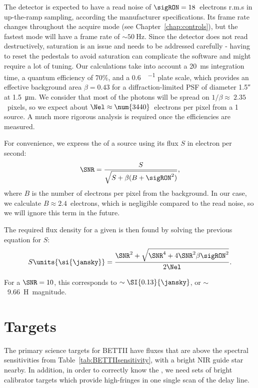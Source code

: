The detector is expected to have a read noise of $\sigRON = 18$~electrons r.m.s in up-the-ramp sampling, according the manufacturer specifications. Its frame rate changes throughout the acquire mode (see Chapter~\ref{chap:controls}), but the fastest mode will have a frame rate of $\sim\SI{50}{\hertz}$. Since the detector does not read destructively, saturation is an issue and needs to be addressed carefully - having to reset the pedestals to avoid saturation can complicate the software and might require a lot of tuning. Our calculations take into account a \SI{20}{\milli\second} integration time, a quantum efficiency of 70\%, and a \SI{0.6}{\arcsec\per\pixel} plate scale, which provides an effective background area $\beta = 0.43$ for a diffraction-limited PSF of diameter \ang{;;1.5} at \SI{1.5}{\micro\meter}. We consider that most of the photons will be spread on $1/\beta\approx~2.35$~pixels, so we expect about $\Nel\approx\num{3440}$~electrons per pixel from a \SI{1}{\jansky} source. A much more rigorous analysis is required once the efficiencies are measured.

For convenience, we express the \SNR of a source using its flux $S$ in electron per second:
\begin{align}
\SNR = \frac{S}{\sqrt{S + \beta(B + \sigRON^2)}},
\end{align}
where $B$ is the number of electrons per pixel from the background. In our case, we calculate $B\approx 2.4$~electrons, which is negligible compared to the read noise, so we will ignore this term in the future.

The required flux density for a given \SNR is then found by solving the previous equation for $S$:
\begin{align}
S\units{\si{\jansky}} = \frac{\SNR^2 + \sqrt{\SNR^4 + 4\SNR^2\beta\sigRON^2}}{2\Nel}.
\end{align}

For a $\SNR=10$, this corresponds to $\sim\SI{0.13}{\jansky}$, or $\sim$~9.66~H~magnitude. 

\section{Targets}

The primary science targets for BETTII have fluxes that are above the spectral sensitivities from Table~\ref{tab:BETTIIsensitivity}, with a bright NIR guide star nearby. In addition, in order to correctly know the \OPD, we need sets of bright calibrator targets which provide high-\SNR fringes in one single scan of the delay line.

